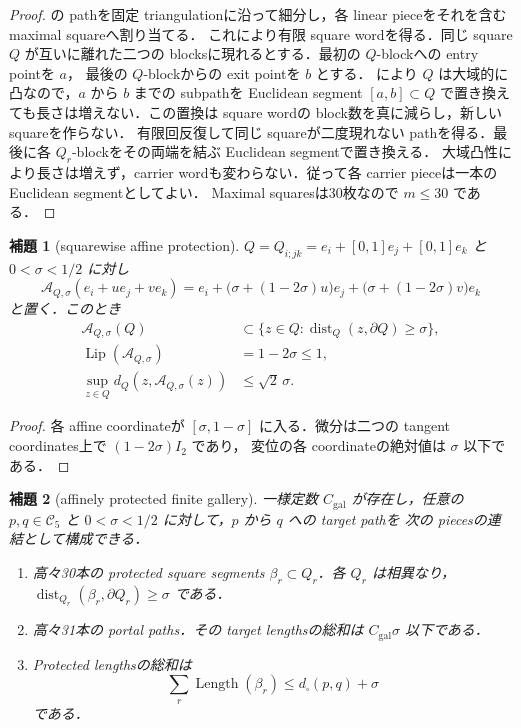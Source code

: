 \documentclass[a4paper,11pt]{ltjsarticle}
\numberwithin{equation}{section}
\theoremstyle{plain}
\newtheorem{lemma}[lemma]{補題}
\theoremstyle{definition}
\theoremstyle{remark}
\newcommand{\cC}{\mathcal C}
\newcommand{\dist}{\operatorname{dist}}
\newcommand{\Length}{\operatorname{Length}}
\newcommand{\Lip}{\operatorname{Lip}}
\begin{document}
\begin{proof}
 の pathを固定 triangulationに沿って細分し，各 linear pieceをそれを含む maximal squareへ割り当てる．
これにより有限 square wordを得る．同じ square $Q$ が互いに離れた二つの blocksに現れるとする．最初の $Q$-blockへの entry pointを $a$，
最後の $Q$-blockからの exit pointを $b$ とする． により $Q$ は大域的に凸なので，$a$ から $b$ までの
subpathを Euclidean segment $[a,b]\subset Q$ で置き換えても長さは増えない．この置換は square wordの block数を真に減らし，新しい squareを作らない．
有限回反復して同じ squareが二度現れない pathを得る．最後に各 $Q_r$-blockをその両端を結ぶ Euclidean segmentで置き換える．
大域凸性により長さは増えず，carrier wordも変わらない．従って各 carrier pieceは一本の Euclidean segmentとしてよい．
Maximal squaresは30枚なので $m\le30$ である．
\end{proof}

\begin{lemma}[squarewise affine protection]\label{lem:square-affine-protection}
$Q=Q_{i;jk}=e_i+[0,1]e_j+[0,1]e_k$ と $0<\sigma<1/2$ に対し
\begin{equation}\label{eq:square-affine-protection}
 \mathscr A_{Q,\sigma}(e_i+u e_j+v e_k)
 =e_i+\bigl(\sigma+(1-2\sigma)u\bigr)e_j
       +\bigl(\sigma+(1-2\sigma)v\bigr)e_k
\end{equation}
と置く．このとき
\begin{align}
 \mathscr A_{Q,\sigma}(Q)
 &\subset\{z\in Q:\dist_Q(z,\partial Q)\ge\sigma\},\label{eq:affine-protected-image}\\
 \Lip(\mathscr A_{Q,\sigma})&=1-2\sigma\le1,\label{eq:affine-protected-lip}\\
 \sup_{z\in Q}d_Q(z,\mathscr A_{Q,\sigma}(z))&\le\sqrt2\,\sigma.
 \label{eq:affine-protected-displacement}
\end{align}
\end{lemma}

\begin{proof}
各 affine coordinateが $[\sigma,1-\sigma]$ に入る．微分は二つの tangent coordinates上で $(1-2\sigma)I_2$ であり，
変位の各 coordinateの絶対値は $\sigma$ 以下である．
\end{proof}

\begin{lemma}[affinely protected finite gallery]\label{lem:reduced-gallery}
一様定数 $C_{\mathrm{gal}}$ が存在し，任意の $p,q\in\cC_5$ と $0<\sigma<1/2$ に対して，$p$ から $q$ への target pathを
次の piecesの連結として構成できる．
\begin{enumerate}[label=\textup{(T\arabic*)}]
\item 高々30本の protected square segments $\beta_r\subset Q_r$．各 $Q_r$ は相異なり，
      $\dist_{Q_r}(\beta_r,\partial Q_r)\ge\sigma$ である．
\item 高々31本の portal paths．その target lengthsの総和は $C_{\mathrm{gal}}\sigma$ 以下である．
\item Protected lengthsの総和は
      \[
       \sum_r\Length(\beta_r)\le d_\square(p,q)+\sigma
      \]
      である．
\end{enumerate}
\end{lemma}
\end{document}
